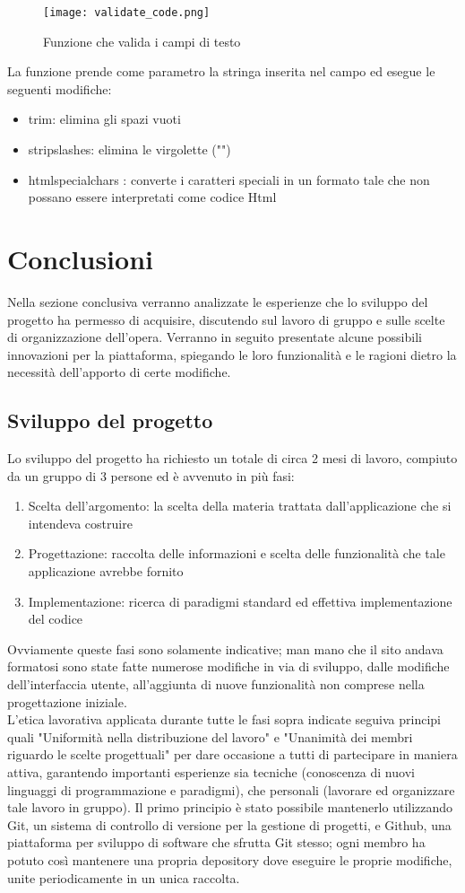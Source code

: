 \documentclass[binding=0.6cm, oneside, noexaminfo, italian]{sapthesis}
\begin{document}
\newpage
\begin{figure}[h]
    \centering
    \texttt{[image: validate\_code.png]}
    \caption{Funzione che valida i campi di testo}
    \label{fig:validate_code}
\end{figure} 
La funzione prende come parametro la stringa inserita nel campo ed esegue le seguenti modifiche:
\begin{itemize}
    \item trim: elimina gli spazi vuoti
    \item stripslashes: elimina le virgolette ("")
    \item htmlspecialchars : converte i caratteri speciali in un formato tale che non possano essere interpretati come codice Html
\end{itemize}
\newpage
\section{Conclusioni}
Nella sezione conclusiva verranno analizzate le esperienze che lo sviluppo del progetto ha permesso di acquisire, discutendo sul lavoro di gruppo e sulle scelte di organizzazione dell'opera. Verranno in seguito presentate alcune possibili innovazioni per la piattaforma, spiegando le loro funzionalità e le ragioni dietro la necessità dell'apporto di certe modifiche.
\subsection{Sviluppo del progetto}
Lo sviluppo del progetto ha richiesto un totale di circa 2 mesi di lavoro, compiuto da un gruppo di 3 persone ed è avvenuto in più fasi:
\begin{enumerate}
    \item Scelta dell'argomento: la scelta della materia trattata dall'applicazione che si intendeva costruire
    \item Progettazione: raccolta delle informazioni e scelta delle funzionalità che tale applicazione avrebbe fornito
    \item Implementazione: ricerca di paradigmi standard ed effettiva implementazione del codice
\end{enumerate}
Ovviamente queste fasi sono solamente indicative; man mano che il sito andava formatosi sono state fatte numerose modifiche in via di sviluppo, dalle modifiche dell'interfaccia utente, all'aggiunta di nuove funzionalità non comprese nella progettazione iniziale. \\
L'etica lavorativa applicata durante tutte le fasi sopra indicate seguiva principi quali "Uniformità nella distribuzione del lavoro" e "Unanimità dei membri riguardo le scelte progettuali" per dare occasione a tutti di partecipare in maniera attiva, garantendo importanti esperienze sia tecniche (conoscenza di nuovi linguaggi di programmazione e paradigmi), che personali (lavorare ed organizzare tale lavoro in gruppo). Il primo principio è stato possibile mantenerlo utilizzando Git, un sistema di controllo di versione per la gestione di progetti, e Github, una piattaforma per sviluppo di software che sfrutta Git stesso; ogni membro ha potuto così mantenere una propria depository dove eseguire le proprie modifiche, unite periodicamente in un unica raccolta. 
\end{document}
